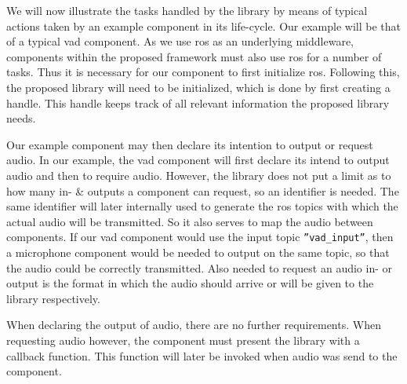 

We will now illustrate the tasks handled by the library by means of typical actions taken by an example component in its life-cycle.
Our example will be that of a typical \gls{vad} component.
As we use \gls{ros} as an underlying middleware, components within the proposed framework must also use \gls{ros} for a number of tasks.
Thus it is necessary for our component to first initialize \gls{ros}.
Following this, the proposed library will need to be initialized, which is done by first creating a handle.
This handle keeps track of all relevant information the proposed library needs.

Our example component may then declare its intention to output or request audio.
In our example, the \gls{vad} component will first declare its intend to output audio and then to require audio.
However, the library does not put a limit as to how many in- \& outputs a component can request, so an identifier is needed.
The same identifier will later internally used to generate the \gls{ros} topics with which the actual audio will be transmitted.
So it also serves to map the audio between components.%
If our \gls{vad} component would use the input topic \texttt{''vad\_input''}, then a microphone component would be needed to output on the same topic, so that the audio could be correctly transmitted.
Also needed to request an audio in- or output is the format in which the audio should arrive or will be given to the library respectively.

When declaring the output of audio, there are no further requirements.
When requesting audio however, the component must present the library with a callback function.
This function will later be invoked when audio was send to the component.

